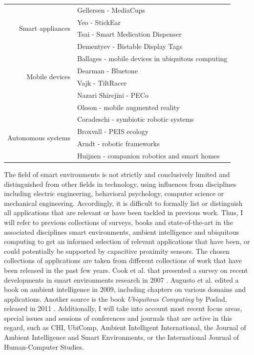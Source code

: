 \begin{table}[htbp]
\begin{tabular}{rl}
    \multirow{4}[0]{*}{Smart appliances} & Gellersen - MediaCups \cite{gellersen1999mediacup} \\
          & Yeo - StickEar \cite{yeo2013stickear} \\
          & Tsai - Smart Medication Dispenser \cite{tsai2011smart} \\
          & Dementyev - Bistable Display Tags \cite{dementyev2013wirelessly} \\[1em]
    \multirow{4}[0]{*}{Mobile devices} & Ballages - mobile devices in ubiquitous computing \cite{ballagas2006smart} \\
          & Dearman - Bluetone \cite{dearman2009bluetone} \\
          	& Vajk - TiltRacer \cite{vajk2007using} \\
          & Nazari Shirejini - PECo \cite{shirehjini2004novel} \\
          & Olsson - mobile augmented reality \cite{olsson2012user} \\[1em]
    \multirow{4}[0]{*}{Autonomous systems} & Coradeschi - symbiotic robotic systems \cite{coradeschi2006symbiotic} \\
          & Broxvall - PEIS ecology \cite{broxvall2006peis} \\
          & Arndt - robotic frameworks \cite{arndt2013performance} \\
          & Huijnen - companion robotics and smart homes \cite{huijnen2011maybe} \\
    \bottomrule
    \end{tabular}%
  \label{tab:rel_se_apps}%
\end{table}

The field of smart environments is not strictly and conclusively limited and distinguished from other fields in technology, using influences from disciplines including electric engineering, behavioral psychology, computer science or mechanical engineering. Accordingly, it is difficult to formally list or distinguish all applications that are relevant or have been tackled in previous work. Thus, I will refer to previous collections of surveys, books and state-of-the-art in the associated disciplines smart environments, ambient intelligence and ubiquitous computing to get an informed selection of relevant applications that have been, or could potentially be supported by capacitive proximity sensors. The chosen collections of applications are taken from different collections of work that have been released in the past few years. Cook et al. that presented a survey on recent developments in smart environments research in 2007 \cite{cook2007smart}. Augusto et al. edited a book on ambient intelligence in 2009, including chapters on various domains and applications. Another source is the book \emph{Ubiquitous Computing} by Poslad, released in 2011 \cite{poslad2011ubiquitous}. Additionally, I will take into account most recent focus areas, special issues and sessions of conferences and journals that are active in this regard, such as CHI, UbiComp, Ambient Intelligent International, the Journal of Ambient Intelligence and Smart Environments, or the International Journal of Human-Computer Studies.

